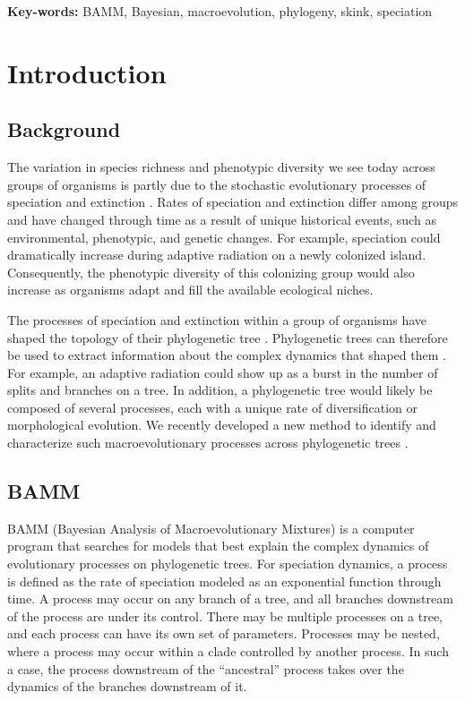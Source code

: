 \documentclass[12pt]{article}
\begin{document}
\begin{flushleft}
\textbf{Key-words:} BAMM, Bayesian, macroevolution, phylogeny, skink, speciation
\end{flushleft}


\pagebreak[4]


\section*{Introduction}

\subsection*{Background}

The variation in species richness and phenotypic diversity we see today
across groups of organisms is partly due to the stochastic
evolutionary processes of speciation and extinction \citep{rab14plos}.
%
Rates of speciation and extinction differ among groups
and have changed through time as a result of unique historical events,
such as environmental, phenotypic, and genetic changes.
%
For example, speciation could dramatically increase
during adaptive radiation on a newly colonized island.
%
Consequently, the phenotypic diversity of this colonizing group
would also increase as organisms adapt and fill
the available ecological niches.


The processes of speciation and extinction within a group of organisms
have shaped the topology of their phylogenetic tree \citep{nee94}.
%
Phylogenetic trees can therefore be used to extract
information about the complex dynamics that shaped them \citep{rab14plos}.
%
For example, an adaptive radiation could show up
as a burst in the number of splits and branches on a tree.
%
In addition, a phylogenetic tree would likely be composed of several processes,
each with a unique rate of diversification or morphological evolution.
%
We recently developed a new method to identify and characterize
such macroevolutionary processes across phylogenetic trees \citep{rab14plos}.


\subsection*{BAMM}

BAMM (Bayesian Analysis of Macroevolutionary Mixtures)
is a computer program that searches for models that best explain
the complex dynamics of evolutionary processes on phylogenetic trees.
%
For speciation dynamics, a process is defined as the rate of speciation
modeled as an exponential function through time.
%
A process may occur on any branch of a tree,
and all branches downstream of the process are under its control.
%
There may be multiple processes on a tree,
and each process can have its own set of parameters.
%
Processes may be nested, where a process may occur
within a clade controlled by another process.
%
In such a case, the process downstream of the ``ancestral'' process
takes over the dynamics of the branches downstream of it.
\end{document}
